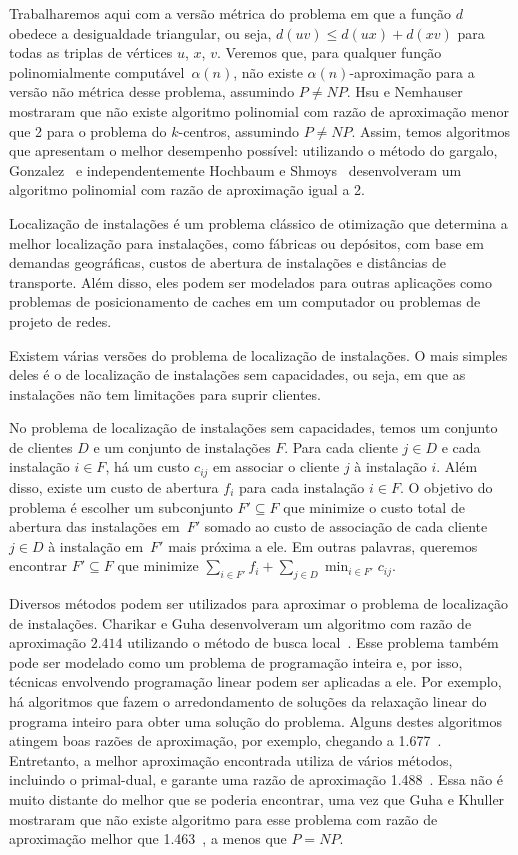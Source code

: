 \documentclass[12pt]{article}
\newcommand{\NP}{\mathit{NP}}
\begin{document}
Trabalharemos aqui com a versão métrica do problema em que a função $d$ obedece a desigualdade triangular, ou seja, $d(uv) \leq d(ux) + d(xv)$ para todas as triplas de vértices $u$, $x$, $v$. Veremos que, para qualquer função polinomialmente computável~$\alpha(n)$, não existe $\alpha(n)$-aproximação para a versão não métrica desse problema, assumindo $P\not=\NP$. Hsu e Nemhauser~\cite{HSU1979209} mostraram que não existe algoritmo polinomial com razão de aproximação menor que 2 para o problema do $k$-centros, assumindo $P\not=\NP$. Assim, temos algoritmos que apresentam o melhor desempenho possível: utilizando o método do gargalo, Gonzalez~\cite{GONZALEZ1985293} e independentemente Hochbaum e Shmoys~\cite{HochShmoys'85} desenvolveram um algoritmo polinomial com razão de aproximação igual a 2. 


Localização de instalações é um problema clássico de otimização que determina a melhor localização para instalações, como fábricas ou depósitos, com base em demandas geográficas, custos de abertura de instalações e distâncias de transporte. Além disso, eles podem ser modelados para outras aplicações como problemas de posicionamento de caches em um computador ou problemas de projeto de redes.

Existem várias versões do problema de localização de instalações. O mais simples deles é o de localização de instalações sem capacidades, ou seja, em que as instalações não tem limitações para suprir clientes.

No problema de localização de instalações sem capacidades, temos um conjunto de clientes $D$ e um conjunto de instalações $F$. Para cada cliente $j \in D$ e cada instalação $i \in F$, há um custo $c_{ij}$ em associar o cliente $j$ à instalação $i$. Além disso, existe um custo de abertura $f_i$ para cada instalação $i \in F$. O objetivo do problema é escolher um subconjunto $F' \subseteq F$ que minimize o custo total de abertura das instalações em~$F'$ somado ao custo de associação de cada cliente $j \in D$ à instalação em~$F'$ mais próxima a ele. Em outras palavras, queremos encontrar $F' \subseteq F$ que minimize $\sum_{i\in F'} f_i + \sum_{j \in D} \min_{i\in F'}c_{ij}$.

Diversos métodos podem ser utilizados para aproximar o problema de localização de instalações. Charikar e Guha desenvolveram um algoritmo com razão de aproximação $2.414$ utilizando o método de busca local~\cite{Charikar&Guha'05}.  Esse problema também pode ser modelado como um problema de programação inteira e, por isso, técnicas envolvendo programação linear podem ser aplicadas a ele.  Por exemplo, há algoritmos que fazem o arredondamento de soluções da relaxação linear do programa inteiro para obter uma solução do problema.  Alguns destes algoritmos atingem boas razões de aproximação, por exemplo, chegando a 1.677~\cite{Byrka&Aardal'10}. Entretanto, a melhor aproximação encontrada utiliza de vários métodos, incluindo o primal-dual, e garante uma razão de aproximação 1.488~\cite{LI'13}. Essa não é muito distante do melhor que se poderia encontrar, uma vez que Guha e Khuller mostraram que não existe algoritmo para esse problema com razão de aproximação melhor que 1.463~\cite{GUHA1999228}, a menos que $P = \NP$.
\end{document}
